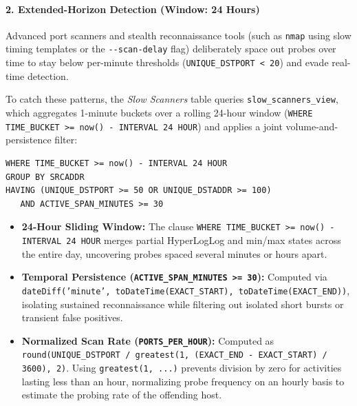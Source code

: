 \documentclass[11pt,a4paper]{article}
\newenvironment{codebox}[1][]{%
    \begin{tcolorbox}[
        colback=codebg,
        colframe=codeframe,
        boxrule=0.6pt,
        arc=1.5mm,
        left=3mm,
        right=3mm,
        top=2mm,
        bottom=2mm,
        fonttitle=\sffamily\bfseries\footnotesize,
        coltitle=chibadark,
        colbacktitle=codeframe!50!white,
        #1
    ]
}{%
    \end{tcolorbox}
}
\begin{document}
\paragraph{2. Extended-Horizon Detection (Window: 24 Hours)}
Advanced port scanners and stealth reconnaissance tools (such as \texttt{nmap} using slow timing templates or the \texttt{-{}-scan-delay} flag) deliberately space out probes over time to stay below per-minute thresholds (\texttt{UNIQUE\_DSTPORT < 20}) and evade real-time detection.

To catch these patterns, the \emph{Slow Scanners} table queries \texttt{slow\_scanners\_view}, which aggregates 1-minute buckets over a rolling 24-hour window (\texttt{WHERE TIME\_BUCKET >= now() - INTERVAL 24 HOUR}) and applies a joint volume-and-persistence filter:

\begin{codebox}[title={24-Hour Stealth Scanner Filter (\texttt{sql/05\_views.sql})}]
\footnotesize
\begin{verbatim}
WHERE TIME_BUCKET >= now() - INTERVAL 24 HOUR
GROUP BY SRCADDR
HAVING (UNIQUE_DSTPORT >= 50 OR UNIQUE_DSTADDR >= 100)
   AND ACTIVE_SPAN_MINUTES >= 30
\end{verbatim}
\end{codebox}

\begin{itemize}
    \item \textbf{24-Hour Sliding Window:} The clause \texttt{WHERE TIME\_BUCKET >= now() - INTERVAL 24 HOUR} merges partial HyperLogLog and min/max states across the entire day, uncovering probes spaced several minutes or hours apart.
    \item \textbf{Temporal Persistence (\texttt{ACTIVE\_SPAN\_MINUTES >= 30}):} Computed via \texttt{dateDiff('minute', toDateTime(EXACT\_START), toDateTime(EXACT\_END))}, isolating sustained reconnaissance while filtering out isolated short bursts or transient false positives.
    \item \textbf{Normalized Scan Rate (\texttt{PORTS\_PER\_HOUR}):} Computed as \texttt{round(UNIQUE\_DSTPORT / greatest(1, (EXACT\_END - EXACT\_START) / 3600), 2)}. Using \texttt{greatest(1, ...)} prevents division by zero for activities lasting less than an hour, normalizing probe frequency on an hourly basis to estimate the probing rate of the offending host.
\end{itemize}

\end{document}
